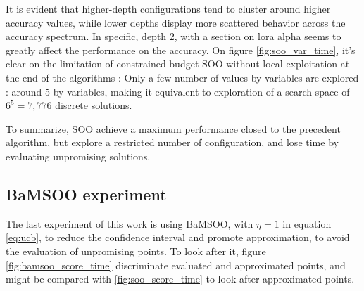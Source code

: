 \documentclass[runningheads]{llncs}
\begin{document}
It is evident that higher-depth configurations tend to cluster around higher accuracy values, while lower depths display more scattered behavior across the accuracy spectrum. In specific, depth 2, with a section on lora alpha seems to greatly affect the performance on the accuracy. On figure \ref{fig:soo_var_time}, it's clear on the limitation of constrained-budget SOO without local exploitation at the end of the algorithms : Only a few number of values by variables are explored : around 5 by variables, making it equivalent to exploration of a search space of $6^5=7,776$ discrete solutions.

To summarize, SOO achieve a maximum performance closed to the precedent algorithm, but explore a restricted number of configuration, and lose time by evaluating unpromising solutions.
\subsection{BaMSOO experiment}
\label{sec:bamsoo_exp}

The last experiment of this work is using BaMSOO, with $\eta = 1$ in equation \ref{eq:ucb}, to reduce the confidence interval and promote approximation, to avoid the evaluation of unpromising points. To look after it, figure \ref{fig:bamsoo_score_time} discriminate evaluated and approximated points, and might be compared with \ref{fig:soo_score_time} to look after approximated points.
\end{document}
